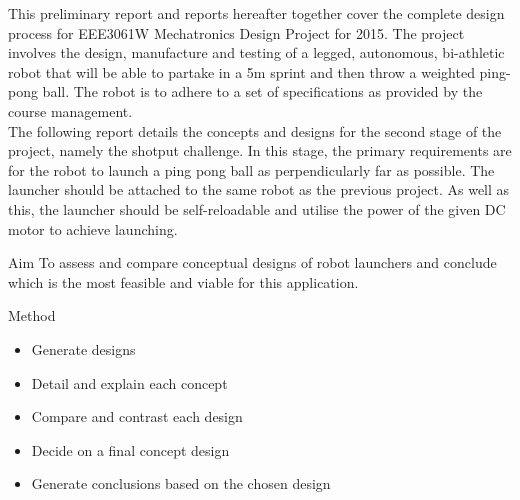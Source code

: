 \begin{homeworkProblem}[{Introduction}]
This preliminary report and reports hereafter together cover the complete design process for EEE3061W Mechatronics Design Project for 2015.  The project involves the design, manufacture and testing of a legged, autonomous, bi-athletic robot that will be able to partake in a 5m sprint and then throw a weighted ping-pong ball.  The robot is to adhere to a set of specifications as provided by the course management. \\

The following report details the concepts and designs for the second stage of the project, namely the shotput challenge. In this stage, the primary requirements are for the robot to launch a ping pong ball as perpendicularly far as possible. The launcher should be attached to the same robot as the previous project. As well as this, the launcher should be self-reloadable and utilise the power of the given DC motor to achieve launching.

\begin{homeworkSection}{Aim}
To assess and compare conceptual designs of robot launchers and conclude which is the most feasible and viable for this application.
\end{homeworkSection}

\begin{homeworkSection}{Method}
  \begin{itemize}
    \item Generate designs
    \item Detail and explain each concept
    \item Compare and contrast each design
    \item Decide on a final concept design
    \item Generate conclusions based on the chosen design
  \end{itemize}
\end{homeworkSection}
\end{homeworkProblem}

